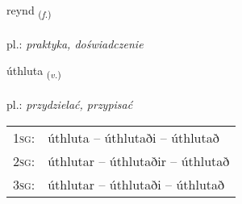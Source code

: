 \documentclass[frontgrid, backgrid]{flacards}\usepackage[]{graphicx}\usepackage[]{xcolor}
\begin{document}
\renewcommand{\flhead}{\vskip5pt \fboxsep=0pt {\small\bfseries\footnotesize Nafnorð | rzeczownik}}
\renewcommand{\fcfoot}{\vskip5pt \fboxsep=0pt \hspace{2pt}{\small\bfseries\footnotesize 3K}}

\renewcommand{\blhead}{\vskip5pt {\small\bfseries\footnotesize Nafnorð | rzeczownik }}
\renewcommand{\bcfoot}{\vskip5pt \hspace{2pt}{\small\bfseries\footnotesize 3K}}


{reynd \small{\textsubscript{(\textit{f.})}} \\[1ex] %
\textphonetic{[reint]} \\
pl.: \emph{praktyka, doświadczenie} \\  [2ex]
\renewcommand*{\arraystretch}{0.8}
}

\renewcommand{\flhead}{\vskip5pt \fboxsep=0pt {\small\bfseries\footnotesize Sagnorð | czasownik}}
\renewcommand{\fcfoot}{\vskip5pt \fboxsep=0pt \hspace{2pt}{\small\bfseries\footnotesize 3K}}

\renewcommand{\blhead}{\vskip5pt {\small\bfseries\footnotesize Sagnorð | czasownik }}
\renewcommand{\bcfoot}{\vskip5pt \hspace{2pt}{\small\bfseries\footnotesize 3K}}


{úthluta \small{\textsubscript{(\textit{v.})}} \\[1ex] %
 \\
pl.: \emph{przydzielać, przypisać} \\  [2ex]
\renewcommand*{\arraystretch}{0.8}
\begin{tabular}{p{1cm}l}
\textsc{1sg}: & úthluta -- úthlutaði -- úthlutað \\ 
\textsc{2sg}: & úthlutar -- úthlutaðir -- úthlutað \\ 
\textsc{3sg}: & úthlutar -- úthlutaði -- úthlutað \\ 
\end{tabular}
}
\end{document}
